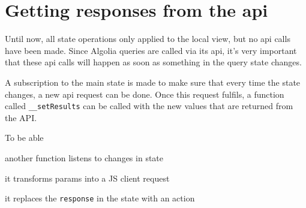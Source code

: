 
\section{Getting responses from the \acrshort{api}} %
\label{sec:getting_responses_from_the_api}

Until now, all state operations only applied to the local view, but no \acrshort{api} calls have been made. Since Algolia queries are called via its \acrshort{api}, it's very important that these \acrshort{api} calls will happen as soon as something in the query state changes. 

A subscription to the main state is made to make sure that every time the state changes, a new \acrshort{api} request can be done. Once this request fulfils, a function called {\tt \_\_setResults} can be called with the new values that are returned from the API.

To be able 

another function listens to changes in state %

it transforms params into a JS client request

it replaces the {\tt response} in the state with an action

